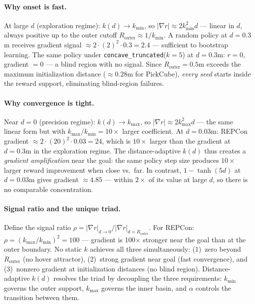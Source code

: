 \documentclass{article}
\begin{document}
\paragraph{Why onset is fast.}
At large $d$ (exploration regime): $k(d) \to k_{\min}$, so $|\nabla r| \approx 2k_{\min}^2 d$
--- linear in $d$, always positive up to the outer cutoff $R_{\mathrm{outer}} \approx
1/k_{\min}$. A random policy at $d=0.3$m receives gradient signal $\approx
2\cdot(2)^2\cdot 0.3 = 2.4$ --- sufficient to bootstrap learning.
The same policy under \texttt{concave\_truncated}($k=5$) at $d=0.3$m: $r = 0$,
gradient $= 0$ --- a blind region with no signal.
Since $R_{\mathrm{outer}} = 0.5$m exceeds the maximum initialization distance
($\approx 0.28$m for PickCube), \emph{every seed} starts inside the reward support,
eliminating blind-region failures.

\paragraph{Why convergence is tight.}
Near $d=0$ (precision regime): $k(d) \to k_{\max}$, so $|\nabla r| \approx 2k_{\max}^2 d$
--- the same linear form but with $k_{\max}/k_{\min} = 10\times$ larger coefficient.
At $d=0.03$m: REPCon gradient $\approx 2\cdot(20)^2\cdot 0.03 = 24$, which is
$10\times$ larger than the gradient at $d=0.3$m in the exploration regime.
The distance-adaptive $k(d)$ thus creates a \emph{gradient amplification} near the goal:
the same policy step size produces $10\times$ larger reward improvement when close vs.\ far.
In contrast, $1-\tanh(5d)$ at $d=0.03$m gives gradient $\approx 4.85$ --- within
$2\times$ of its value at large $d$, so there is no comparable concentration.

\paragraph{Signal ratio and the unique triad.}
Define the signal ratio $\rho = |\nabla r|_{d \to 0} / |\nabla r|_{d=R_{\mathrm{outer}}}$.
For REPCon: $\rho = (k_{\max}/k_{\min})^2 = 100$ --- gradient is 100$\times$ stronger
near the goal than at the outer boundary.
No static $k$ achieves all three simultaneously: (1)~zero beyond $R_{\mathrm{outer}}$
(no hover attractor), (2)~strong gradient near goal (fast convergence), and
(3)~nonzero gradient at initialization distances (no blind region).
Distance-adaptive $k(d)$ resolves the triad by decoupling the three requirements:
$k_{\min}$ governs the outer support, $k_{\max}$ governs the inner basin, and
$\alpha$ controls the transition between them.
\end{document}
